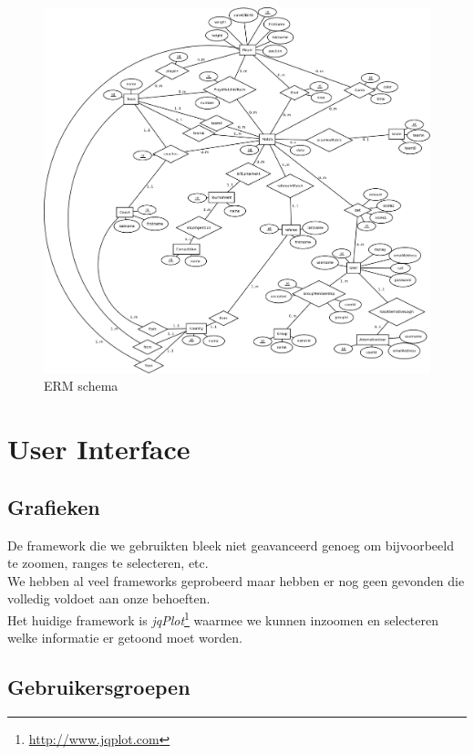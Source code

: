 \documentclass[11pt]{article}
\begin{document}
\begin{figure}[h!]
	\begin{center}
	\includegraphics[scale=0.11]{ERM2.png}

	\caption{ERM schema}
	\label{fig:speler}
	\end{center}
\end{figure}
\section{User Interface}


\subsection{Grafieken}

De framework die we gebruikten bleek niet geavanceerd genoeg om bijvoorbeeld te zoomen, ranges te selecteren, etc.\\
We hebben al veel frameworks geprobeerd maar hebben er nog geen gevonden die volledig voldoet aan onze behoeften.\\
Het huidige framework is \emph{jqPlot}\footnote{\url{http://www.jqplot.com}} waarmee we kunnen inzoomen en selecteren welke informatie er getoond moet worden.



\subsection{Gebruikersgroepen}
\end{document}
